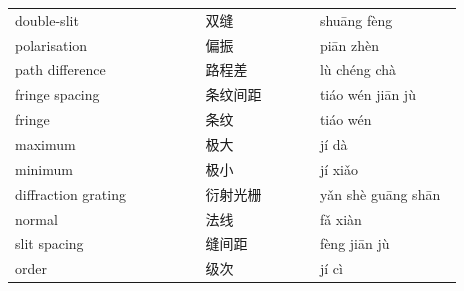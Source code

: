 \documentclass[11pt]{article}
\begin{document}
\begin{longtable}{@{}p{0.40\linewidth}p{0.24\linewidth}p{0.30\linewidth}@{}}
double-slit & 双缝 & shuāng fèng \\
polarisation & 偏振 & piān zhèn \\
path difference & 路程差 & lù chéng chà \\
fringe spacing & 条纹间距 & tiáo wén jiān jù \\
fringe & 条纹 & tiáo wén \\
maximum & 极大 & jí dà \\
minimum & 极小 & jí xiǎo \\
diffraction grating & 衍射光栅 & yǎn shè guāng shān \\
normal & 法线 & fǎ xiàn \\
slit spacing & 缝间距 & fèng jiān jù \\
order & 级次 & jí cì \\
\end{longtable}
\end{document}
